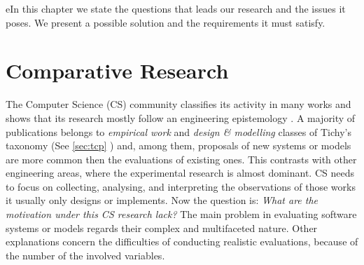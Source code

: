 eIn this chapter we state the questions that leads our research and the issues it poses. We present a possible solution and the requirements it must satisfy.

\section{Comparative Research}
The Computer Science (CS) community classifies its activity in many works and shows that its research mostly follow an engineering epistemology \cite{Wainer:2009:EEC:1518331.1518552,Tichy:1995:EEC:209090.209093}. A majority of publications belongs to \textit{empirical work} and \textit{design \& modelling} classes of Tichy's taxonomy (See \ref{sec:tcp} ) and, among them, proposals of new systems or models  are more common then the evaluations of existing ones. This contrasts with other engineering areas, where the experimental research is almost dominant. CS needs to focus on collecting, analysing, and interpreting the observations of those works it usually only designs or implements. Now the question is: \textit{What are the motivation under this CS research lack?} The main problem in evaluating software systems or models regards their complex and multifaceted nature. Other explanations concern the difficulties of conducting realistic evaluations, because of the number of the involved variables.

